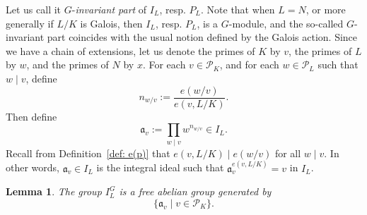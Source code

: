 \documentclass{amsart}
\numberwithin{equation}{section}
\theoremstyle{plain}
\newtheorem{lemma}[theorem]{Lemma}
\theoremstyle{definition}
\theoremstyle{remark}
\begin{document}
Let us call it $G$-\emph{invariant part} of $I_L$, resp. $P_L$.
Note that when $L=N$, or more generally if $L/K$ is Galois, then $I_L$, resp. $P_L$, is a $G$-module, and the so-called $G$-invariant part coincides with the usual notion defined by the Galois action.
Since we have a chain of extensions, let us denote the primes of $K$ by $v$, the primes of $L$ by $w$, and the primes of $N$ by $x$.
For each $v\in\mathcal{P}_K$, and for each $w\in\mathcal{P}_L$ such that $w\mid v$, define
\begin{equation*}
    n_{w/v}:=\frac{e(w/v)}{e(v,L/K)}.
\end{equation*}
Then define
\begin{equation}\label{eqn: a(p)}
    \mathfrak{a}_{v}:=\prod_{w\mid v}w^{n_{w/v}}\in I_L.
\end{equation}
Recall from Definition~\ref{def: e(p)} that $e(v,L/K)\mid e(w/v)$ for all $w\mid v$.
In other words, $\mathfrak{a}_{v}\in I_L$ is the integral ideal such that $\mathfrak{a}_{v}^{e(v,L/K)}=v$ in $I_L$.
\begin{lemma}\label{lemma: I(L)^G}
	The group $I_L^G$ is a free abelian group generated by 
	\begin{equation*}
		\{\mathfrak{a}_v\mid v\in\mathcal{P}_K\}.
	\end{equation*}
\end{lemma}
\end{document}
